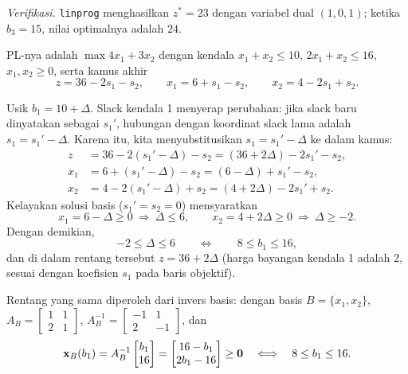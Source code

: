 \emph{Verifikasi.} \texttt{linprog} menghasilkan $z^* = 23$ dengan variabel dual $(1, 0, 1)$; ketika $b_3 = 15$, nilai optimalnya adalah $24$.


PL-nya adalah $\max 4x_1 + 3x_2$ dengan kendala $x_1 + x_2 \le 10$, $2x_1 + x_2 \le 16$, $x_1, x_2 \ge 0$, serta kamus akhir
\[
z = 36 - 2s_1 - s_2, \qquad x_1 = 6 + s_1 - s_2, \qquad x_2 = 4 - 2s_1 + s_2 .
\]

Usik $b_1 = 10 + \Delta$. Slack kendala 1 menyerap perubahan: jika slack baru dinyatakan sebagai $s_1'$, hubungan dengan koordinat slack lama adalah $s_1 = s_1' - \Delta$. Karena itu, kita menyubstitusikan $s_1 = s_1' - \Delta$ ke dalam kamus:
\[
\begin{aligned}
z   &= 36 - 2(s_1' - \Delta) - s_2 = (36 + 2\Delta) - 2s_1' - s_2, \\
x_1 &= 6 + (s_1' - \Delta) - s_2 = (6 - \Delta) + s_1' - s_2, \\
x_2 &= 4 - 2(s_1' - \Delta) + s_2 = (4 + 2\Delta) - 2s_1' + s_2 .
\end{aligned}
\]
Kelayakan solusi basis ($s_1' = s_2 = 0$) mensyaratkan
\[
x_1 = 6 - \Delta \ge 0 \ \Rightarrow\ \Delta \le 6,
\qquad
x_2 = 4 + 2\Delta \ge 0 \ \Rightarrow\ \Delta \ge -2 .
\]
Dengan demikian,
\[
-2 \le \Delta \le 6
\qquad\Longleftrightarrow\qquad
\boxed{8 \le b_1 \le 16},
\]
dan di dalam rentang tersebut $z = 36 + 2\Delta$ (harga bayangan kendala 1 adalah $2$, sesuai dengan koefisien $s_1$ pada baris objektif).

Rentang yang sama diperoleh dari invers basis: dengan basis $B = \{x_1, x_2\}$, $A_B = \begin{bmatrix} 1 & 1 \\ 2 & 1 \end{bmatrix}$, $A_B^{-1} = \begin{bmatrix} -1 & 1 \\ 2 & -1 \end{bmatrix}$, dan
\[
\mathbf{x}_B(b_1) = A_B^{-1}\begin{bmatrix} b_1 \\ 16 \end{bmatrix} = \begin{bmatrix} 16 - b_1 \\ 2b_1 - 16 \end{bmatrix} \ge \mathbf{0}
\quad\Longleftrightarrow\quad 8 \le b_1 \le 16 .
\]

